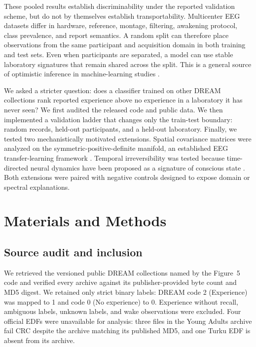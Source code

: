 \documentclass[10pt,twocolumn]{article}
\begin{document}
These pooled results establish discriminability under the reported validation
scheme, but do not by themselves establish transportability. Multicenter EEG
datasets differ in hardware, reference, montage, filtering, awakening
protocol, class prevalence, and report semantics. A random split can therefore
place observations from the same participant and acquisition domain in both
training and test sets. Even when participants are separated, a model can use
stable laboratory signatures that remain shared across the split. This is a
general source of optimistic inference in machine-learning studies
\citep{varoquaux2018crossvalidation,kapoor2023leakage}.

We asked a stricter question: does a classifier trained on other DREAM
collections rank reported experience above no experience in a laboratory it
has never seen? We first audited the released code and public data. We then
implemented a validation ladder that changes only the train-test boundary:
random records, held-out participants, and a held-out laboratory. Finally, we
tested two mechanistically motivated extensions. Spatial covariance matrices
were analyzed on the symmetric-positive-definite manifold, an established EEG
transfer-learning framework \citep{barachant2012riemann,zanini2018transfer}.
Temporal irreversibility was tested because time-directed neural dynamics have
been proposed as a signature of conscious state \citep{delafuente2023time}.
Both extensions were paired with negative controls designed to expose domain
or spectral explanations.

\section{Materials and Methods}

\subsection{Source audit and inclusion}

We retrieved the versioned public DREAM collections named by the Figure~5 code
and verified every archive against its publisher-provided byte count and MD5
digest. We retained only strict binary labels: DREAM code 2 (Experience) was
mapped to 1 and code 0 (No experience) to 0. Experience without recall,
ambiguous labels, unknown labels, and wake observations were excluded. Four
official EDFs were unavailable for analysis: three files in the Young Adults
archive fail CRC despite the archive matching its published MD5, and one Turku
EDF is absent from its archive.
\end{document}
